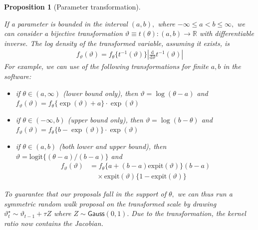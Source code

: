 \documentclass[
  11pt,
  letterpaper,
]{scrbook}
\providecommand{\tightlist}{%
  \setlength{\itemsep}{0pt}\setlength{\parskip}{0pt}}
\theoremstyle{definition}
\theoremstyle{plain}
\newtheorem{proposition}{Proposition}[chapter]
\theoremstyle{plain}
\theoremstyle{plain}
\theoremstyle{definition}
\theoremstyle{definition}
\theoremstyle{plain}
\newtheorem{proposition}{Proposition}[chapter]
\theoremstyle{plain}
\theoremstyle{remark}
\begin{document}
\begin{proposition}[Parameter
transformation]\protect\hypertarget{prp-parameter-transformation}{}\label{prp-parameter-transformation}

If a parameter is bounded in the interval \((a,b),\) where
\(-\infty \leq a < b \leq \infty,\) we can consider a bijective
transformation \(\vartheta \equiv t(\theta): (a,b) \to \mathbb{R}\) with
differentiable inverse. The log density of the transformed variable,
assuming it exists, is \begin{align*}
f_\vartheta(\vartheta) = f_{\theta}\{t^{-1}(\vartheta)\} \left| \frac{\mathrm{d}}{\mathrm{d} \vartheta} t^{-1}(\vartheta)\right|
\end{align*} For example, we can use of the following transformations
for finite \(a, b\) in the software:

\begin{itemize}
\tightlist
\item
  if \(\theta \in (a, \infty)\) (lower bound only), then
  \(\vartheta = \log(\theta-a)\) and
  \(f_{\vartheta}(\vartheta)=f_{\theta}\{\exp(\vartheta) + a\}\cdot \exp(\vartheta)\)
\item
  if \(\theta \in (-\infty, b)\) (upper bound only), then
  \(\vartheta = \log(b-\theta)\) and
  \(f_{\vartheta}(\vartheta)=f_{\theta}\{b-\exp(\vartheta)\}\cdot \exp(\vartheta)\)
\item
  if \(\theta \in (a, b)\) (both lower and upper bound), then
  \(\vartheta = \mathrm{logit}\{(\theta-a)/(b-a)\}\) and \begin{align*}
  f_{\vartheta}(\vartheta)&=f_{\theta}\{a+(b-a) \mathrm{expit}(\vartheta)\} (b-a)\\&\quad \times \mathrm{expit}(\vartheta)\{1-\mathrm{expit}(\vartheta)\}
  \end{align*}
\end{itemize}

To guarantee that our proposals fall in the support of \(\theta,\) we
can thus run a symmetric random walk proposal on the \emph{transformed
scale} by drawing \(\vartheta_{t}^{\star} \sim \vartheta_{t-1}+\tau Z\)
where \(Z\sim\mathsf{Gauss}(0, 1).\) Due to the transformation, the
kernel ratio now contains the Jacobian.

\end{proposition}
\end{document}
